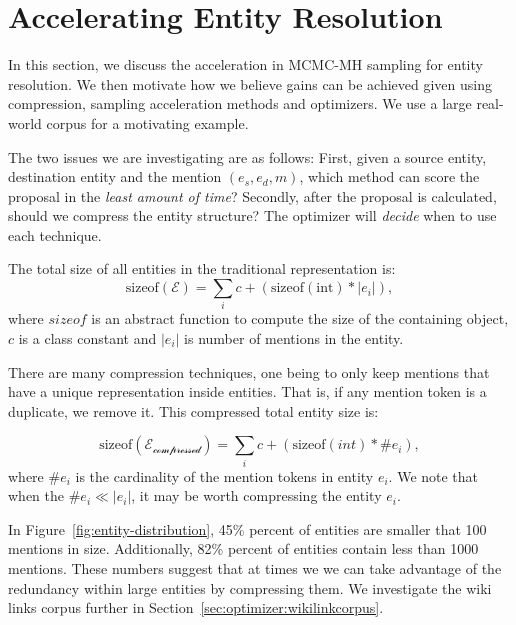 
\section{Accelerating Entity Resolution}
\label{sec:optimizer:example}

In this section, we discuss the acceleration in MCMC-MH sampling for entity resolution.
We then motivate how we believe gains can be achieved given using compression,
sampling acceleration methods and optimizers.
We use a large real-world corpus for a motivating example.

The two issues we are investigating are as follows:
First, given a source entity, 
destination entity and the mention \((e_s, e_d, m)\), which method can score the proposal in the \textit{least amount of time}?
Secondly, after the proposal is calculated, should we compress the entity structure?
The optimizer will \textit{decide} when to use each technique.

The total size of all entities in the traditional representation is:
\begin{equation}
  \text{sizeof}(\mathcal{E}) =  \sum_i c + (\text{sizeof}(\text{int}) * |e_i|),
\end{equation}
where $sizeof$ is an abstract function to compute the size of the containing object,
$c$ is a class constant and $|e_i|$ is number of mentions in the entity.

There are many compression techniques, one being to only keep mentions 
that have a unique representation inside entities.
That is, if any mention token is a duplicate, we remove it.
This compressed total entity size is:

\begin{equation}
  \text{sizeof}(\mathcal{E_\text{compressed}}) = \sum_i c + (\text{sizeof}(int) * \#e_i ),
\end{equation}
where $\#e_i$ is the cardinality of the mention tokens in entity $e_i$.
We note that when the $\#e_i \ll |e_i|$, it may be worth compressing the entity $e_i$.


In Figure~\ref{fig:entity-distribution},
45\% percent of entities are smaller that 100 mentions in size.
Additionally, 82\% percent of entities contain less than 1000 mentions.
These numbers suggest that at times we we can take advantage of the redundancy within
large entities by compressing them.
We investigate the wiki links corpus further in Section~\ref{sec:optimizer:wikilinkcorpus}. 


